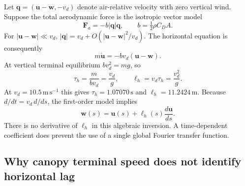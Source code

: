 Let $\boldsymbol q=(\boldsymbol u-\boldsymbol w,-v_d)$ denote air-relative
velocity with zero vertical wind. Suppose the total aerodynamic force is
the isotropic vector model
\begin{equation}
 \boldsymbol F_a=-b\lvert\boldsymbol q\rvert\boldsymbol q,
 \qquad b=\tfrac12\rho C_DA.
\end{equation}
For $\lvert\boldsymbol u-\boldsymbol w\rvert\ll v_d$,
$\lvert\boldsymbol q\rvert=v_d+O(\lvert\boldsymbol u-\boldsymbol w\rvert^2/v_d)$.
The horizontal equation is consequently
\begin{equation}
 m\dot{\boldsymbol u}=-bv_d(\boldsymbol u-\boldsymbol w).
\end{equation}
At vertical terminal equilibrium $bv_d^2=mg$, so
\begin{equation}
 \tau_h=\frac{m}{bv_d}=\frac{v_d}{g},\qquad
 \ell_h=v_d\tau_h=\frac{v_d^2}{g}.
\end{equation}
At $v_d=10.5\,\mathrm{m\,s^{-1}}$ this gives
$\tau_h=1.07070\,\mathrm s$ and $\ell_h=11.2424\,\mathrm m$.
Because $d/dt=v_d\,d/ds$, the first-order model implies
\begin{equation}
 \boldsymbol w(s)=\boldsymbol u(s)+\ell_h(s)
                       \frac{d\boldsymbol u}{ds}.
\end{equation}
There is no derivative of $\ell_h$ in this algebraic inversion. A
time-dependent coefficient does prevent the use of a single global Fourier
transfer function.

\subsection{Why canopy terminal speed does not identify horizontal lag}

